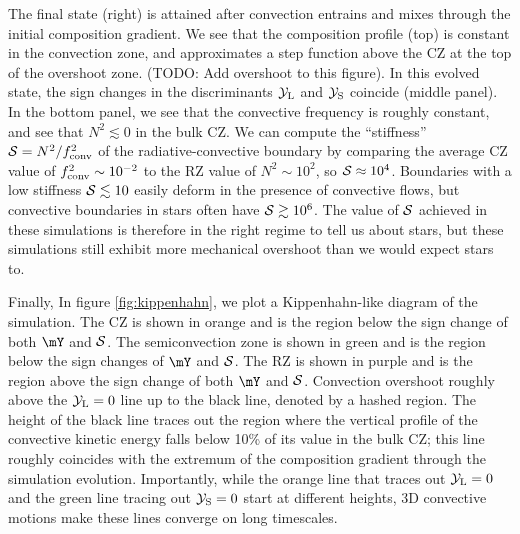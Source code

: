 The final state (right) is attained after convection entrains and mixes through the initial composition gradient.
We see that the composition profile (top) is constant in the convection zone, and approximates a step function above the CZ at the top of the overshoot zone. (TODO: Add overshoot to this figure).
In this evolved state, the sign changes in the discriminants $\mathcal{Y}_{\rm{L}}$ and $\mathcal{Y}_{\rm{S}}$ coincide (middle panel).
In the bottom panel, we see that the convective frequency is roughly constant, and see that $N^2 \lesssim 0$ in the bulk CZ.
We can compute the ``stiffness'' $\mathcal{S} = N^2 / f_{\rm{conv}}^2$ of the radiative-convective boundary by comparing the average CZ value of $f_{\rm{conv}}^2 \sim 10^{-2}$ to the RZ value of $N^2 \sim 10^2$, so $\mathcal{S} \approx 10^4$.
Boundaries with a low stiffness $\mathcal{S} \lesssim 10$ easily deform in the presence of convective flows, but convective boundaries in stars often have $\mathcal{S} \gtrsim 10^6$.
The value of $\mathcal{S}$ achieved in these simulations is therefore in the right regime to tell us about stars, but these simulations still exhibit more mechanical overshoot than we would expect stars to.


Finally, In figure \ref{fig:kippenhahn}, we plot a Kippenhahn-like diagram of the simulation.
The CZ is shown in orange and is the region below the sign change of both $\mY$ and $\mathcal{S}$.
The semiconvection zone is shown in green and is the region below the sign changes of $\mY$ and $\mathcal{S}$.
The RZ is shown in purple and is the region above the sign change of both $\mY$ and $\mathcal{S}$.
Convection overshoot roughly above the $\mathcal{Y}_{\rm{L}} = 0$ line up to the black line, denoted by a hashed region.
The height of the black line traces out the region where the vertical profile of the convective kinetic energy falls below 10\% of its value in the bulk CZ; this line roughly coincides with the extremum of the composition gradient through the simulation evolution.
Importantly, while the orange line that traces out $\mathcal{Y}_{\rm{L}} = 0$ and the green line tracing out $\mathcal{Y}_{\rm{S}} = 0$ start at different heights, 3D convective motions make these lines converge on long timescales.


